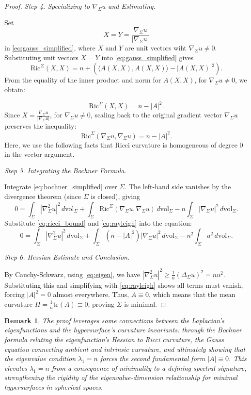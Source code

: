 \documentclass[a4, 12pt]{amsart}
\numberwithin{equation}{section} \numberwithin{equation}{section}
\newtheorem{rem}{Remark}[section]{\bfseries\upshape}
\begin{document}
\begin{proof}
\textit{Step 4. Specializing to \(\nabla_\Sigma u\) and Estimating.}

Set \[X = Y = \frac{\nabla_\Sigma u}{|\nabla_\Sigma u|}\] in \eqref{eq:gauss_simplified}, where \(X\) and \(Y\) are unit vectors wiht \(\nabla_\Sigma u \neq 0\).
Substituting unit vectors \(X = Y\) into \eqref{eq:gauss_simplified} gives
\[
\text{Ric}^\Sigma(X, X) = n   + \left( \langle A(X, X), A(X, X) \rangle - |A(X, X)|^2 \right).
\]
From the equality of the inner product and norm for \(A(X,X)\), for \(\nabla_\Sigma u \neq 0\), we obtain:

\[
\text{Ric}^\Sigma(X, X) = n - |A|^2.
\]
Since \(X = \frac{\nabla_\Sigma u}{|\nabla_\Sigma u|}\), for \(\nabla_\Sigma u \neq 0\), scaling back to the original gradient vector \(\nabla_\Sigma u\) preserves the inequality:
\begin{equation}\label{eq:ricci_bound}
\text{Ric}^\Sigma(\nabla_\Sigma u, \nabla_\Sigma u) = n - |A|^2.
\end{equation}Here, we use the following facts that Ricci curvature is homogeneous of degree 0 in the vector argument.

\textit{Step 5. Integrating the Bochner Formula.}

Integrate \eqref{eq:bochner_simplified} over \(\Sigma\). The left-hand side vanishes by the divergence theorem (since \(\Sigma\) is closed), giving
\[
0 = \int_\Sigma |\nabla^2_\Sigma u|^2 \, d\mathrm{vol}_\Sigma + \int_\Sigma \text{Ric}^\Sigma(\nabla_\Sigma u, \nabla_\Sigma u) \, d\mathrm{vol}_\Sigma - n \int_\Sigma |\nabla_\Sigma u|^2 \, d\mathrm{vol}_\Sigma.
\] Substitute \eqref{eq:ricci_bound} and \eqref{eq:rayleigh} into the equation:
\[
0 = \int_\Sigma |\nabla^2_\Sigma u|^2 \, d\mathrm{vol}_\Sigma + \int_\Sigma (n - |A|^2) |\nabla_\Sigma u|^2 \, d\mathrm{vol}_\Sigma - n^2 \int_\Sigma u^2 \, d\mathrm{vol}_\Sigma.
\]

\textit{Step 6. Hessian Estimate and Conclusion.}

By Cauchy-Schwarz, using \eqref{eq:eigen}, we have \(|\nabla^2_\Sigma u|^2 \geq \frac{1}{n} (\Delta_\Sigma u)^2 = n u^2\). Substituting this and simplifying with \eqref{eq:rayleigh} shows all terms must vanish, forcing \(|A|^2 = 0\) almost everywhere.
Thus, \(A \equiv 0\), which means that the mean curvature \(H = \frac{1}{n} \text{tr}(A) \equiv 0\), proving \(\Sigma\) is minimal.
\end{proof}






\begin{rem}The proof leverages some connections between the Laplacian's eigenfunctions and the hypersurface's curvature invariants: through the Bochner formula relating the eigenfunction's Hessian to Ricci curvature, the Gauss equation connecting ambient and intrinsic curvature, and ultimately showing that the eigenvalue condition $\lambda_1 = n$ forces the second fundamental form $|A| \equiv 0$. This elevates $\lambda_1 = n$ from a consequence of minimality to a defining spectral signature, strengthening the rigidity of the eigenvalue-dimension relationship for minimal hypersurfaces in spherical spaces.\end{rem}
\end{document}
